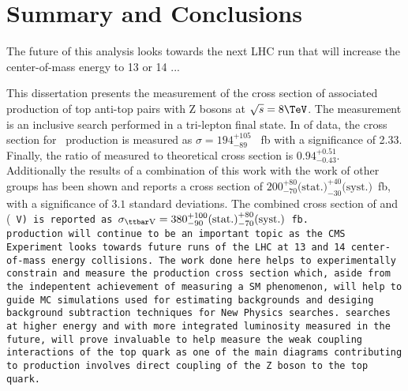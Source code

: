 \chapter{Summary and Conclusions}
\label {ch:conclusion}

The future of this analysis looks towards the next LHC run that will increase
the center-of-mass energy to 13 or 14 \TeV...


This dissertation presents the measurement of the cross section of associated production of top anti-top pairs with Z bosons at $\sqrt{s} = 8 \TeV$. The measurement is an inclusive search performed in a tri-lepton final state. In \intLumi of data, the cross section for \ttZ \ production is measured as $\sigma=194 _{-89} ^{+105}$ \ fb with a significance of 2.33. Finally, the ratio of measured to theoretical cross section is $0.94_{-0.43} ^{+0.51}$.\\

Additionally the results of a combination of this work with the work of other groups has been shown and reports a \ttZ cross section of 
$200 ^{+80}_{-70} \textrm{(stat.)} ^{+40}_{-30} \textrm{(syst.)}$~fb, with a significance of $3.1$ standard deviations. The combined cross section of \ttZ and \ttW (\tt~V) is reported as $\sigma_{\ttbar\textrm{V}} = 380 ^{+100}_{-90} \textrm{(stat.)} ^{+80}_{-70} \textrm{(syst.)}$~fb.\\

\ttZ production will continue to be an important topic as the CMS Experiment looks towards future runs of the LHC at 13 and 14 \TeV center-of-mass energy collisions. The work done here helps to experimentally constrain and measure the \ttZ production cross section which, aside from the indepentent achievement of measuring a SM phenomenon, will help to guide MC simulations used for estimating backgrounds and desiging background subtraction techniques for New Physics searches. \ttZ searches at higher energy and with more integrated luminosity measured in the future, will prove invaluable to help measure the weak coupling interactions of the top quark as one of the main diagrams contributing to \ttZ production involves direct coupling of the Z boson to the top quark.\\ 
